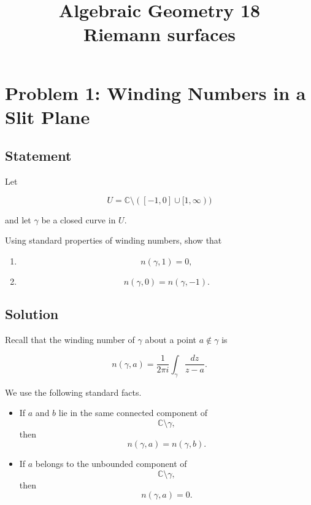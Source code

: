 \documentclass[12pt,a4paper]{article}
\theoremstyle{notespace}
\begin{document}
\title{Algebraic Geometry 18\\
	\large Riemann surfaces}
\author{}
\date{}

	\maketitle
	

	\setcounter{section}{0}

\tableofcontents

	\clearpage

\section{Problem 1: Winding Numbers in a Slit Plane}

\subsection*{Statement}

Let

\[
U=\mathbb C\setminus([-1,0]\cup[1,\infty))
\]

and let \(\gamma\) be a closed curve in \(U\).

Using standard properties of winding numbers, show that

\begin{enumerate}
	\item
	\[
	n(\gamma,1)=0,
	\]
	
	\item
	\[
	n(\gamma,0)=n(\gamma,-1).
	\]
\end{enumerate}

\subsection*{Solution}

Recall that the winding number of \(\gamma\) about a point \(a\notin\gamma\) is

\[
n(\gamma,a)
=
\frac{1}{2\pi i}
\int_\gamma \frac{dz}{z-a}.
\]

We use the following standard facts.

\begin{itemize}
	\item If \(a\) and \(b\) lie in the same connected component of
	\[
	\mathbb C\setminus\gamma,
	\]
	then
	\[
	n(\gamma,a)=n(\gamma,b).
	\]
	
	\item If \(a\) belongs to the unbounded component of
	\[
	\mathbb C\setminus\gamma,
	\]
	then
	\[
	n(\gamma,a)=0.
	\]
\end{itemize}
\end{document}
